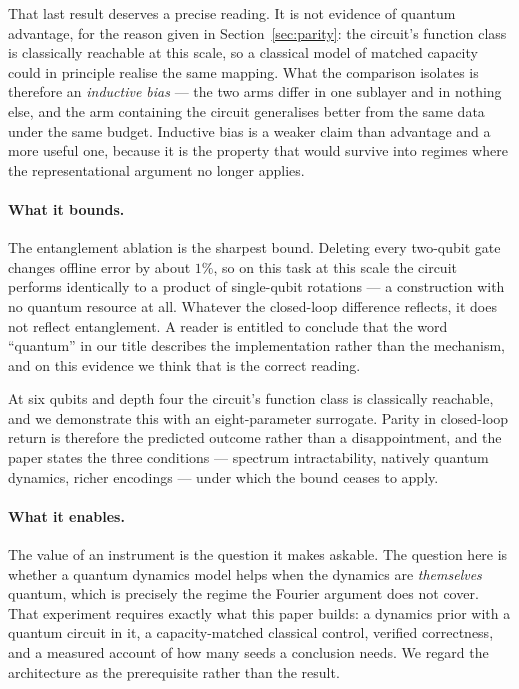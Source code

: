 \documentclass[11pt,onecolumn]{article}
\begin{document}
That last result deserves a precise reading. It is not evidence of
quantum advantage, for the reason given in
Section~\ref{sec:parity}: the circuit's function class is classically
reachable at this scale, so a classical model of matched capacity could
in principle realise the same mapping. What the comparison isolates is
therefore an \emph{inductive bias} --- the two arms differ in one
sublayer and in nothing else, and the arm containing the circuit
generalises better from the same data under the same budget. Inductive
bias is a weaker claim than advantage and a more useful one, because it
is the property that would survive into regimes where the
representational argument no longer applies.

\paragraph{What it bounds.}
The entanglement ablation is the sharpest bound. Deleting every
two-qubit gate changes offline error by about $1\%$, so on this task at
this scale the circuit performs identically to a product of single-qubit
rotations --- a construction with no quantum resource at all. Whatever
the closed-loop difference reflects, it does not reflect entanglement. A
reader is entitled to conclude that the word ``quantum'' in our title
describes the implementation rather than the mechanism, and on this
evidence we think that is the correct reading.

At six qubits and depth four the circuit's function class is classically
reachable, and we demonstrate this with an eight-parameter surrogate.
Parity in closed-loop return is therefore the predicted outcome rather
than a disappointment, and the paper states the three conditions ---
spectrum intractability, natively quantum dynamics, richer encodings ---
under which the bound ceases to apply.

\paragraph{What it enables.}
The value of an instrument is the question it makes askable. The
question here is whether a quantum dynamics model helps when the
dynamics are \emph{themselves} quantum, which is precisely the regime
the Fourier argument does not cover. That experiment requires exactly
what this paper builds: a dynamics prior with a quantum circuit in it, a
capacity-matched classical control, verified correctness, and a measured
account of how many seeds a conclusion needs. We regard the architecture
as the prerequisite rather than the result.
\end{document}
